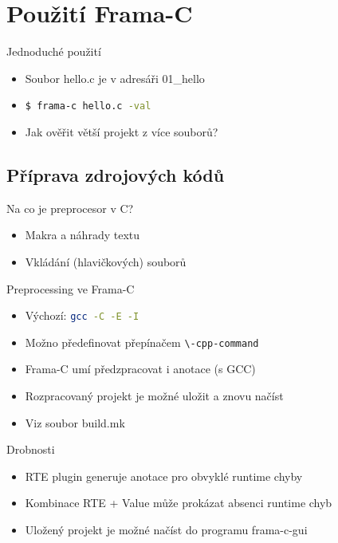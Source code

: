 \documentclass[11pt]{beamer}
\begin{document}
\section{Použití Frama-C}

\begin{frame}{Jednoduché použití}
\begin{itemize}
	\item Soubor hello.c je v adresáři 01\_hello
	\item \lstinline[language=bash]{$ frama-c hello.c -val}
	\item Jak ověřit větší projekt z více souborů?
\end{itemize}
\end{frame}


\subsection{Příprava zdrojových kódů}

\begin{frame}{Na co je preprocesor v C?}
\begin{itemize}
	\pause \item Makra a náhrady textu
	\pause \item Vkládání (hlavičkových) souborů
\end{itemize}
\end{frame}

\begin{frame}{Preprocessing ve Frama-C}
\begin{itemize}
	\item Výchozí: \lstinline[language=bash]{gcc -C -E -I}
	\item Možno předefinovat přepínačem \lstinline[language=bash]{\-cpp-command}
	\item Frama-C umí předzpracovat i anotace (s GCC)
	\item Rozpracovaný projekt je možné uložit a znovu načíst
	\item Viz soubor build.mk
\end{itemize}
\end{frame}


\begin{frame}{Drobnosti}
	\begin{itemize}
		\item RTE plugin generuje anotace pro obvyklé runtime chyby
		\item Kombinace RTE + Value může prokázat absenci runtime chyb
		\item Uložený projekt je možné načíst do programu frama-c-gui
	\end{itemize}
\end{frame}
\end{document}
